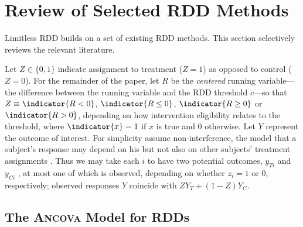 \section{Review of Selected RDD Methods}\label{sec:review}


Limitless RDD builds on a set of existing RDD methods.
This section selectively reviews the relevant literature.

Let $Z \in \{0,1\}$ indicate assignment to treatment ($Z=1$) as opposed to control
($Z=0$).
For the remainder of the paper, let $R$ be the \emph{centered} running
variable---the difference between the running variable and the RDD
threshold $c$---so that $Z \equiv \indicator{R< 0}$,
$\indicator{R \leq 0}$, $\indicator{R\geq 0}$ or $\indicator{R > 0}$,
depending on how intervention eligibility relates to the threshold,
where $\indicator{x}=1$ if $x$ is true and $0$ otherwise.
Let $Y$ represent the outcome of interest.
For simplicity assume non-interference, the model that
a subject's response may depend on his but not also on other subjects'
treatment assignments \citep{cox:1958,rubin:1978}.  Thus we may take each $i$
to have two potential outcomes, $y_{Ti}$ and $y_{Ci}$ , at most one of which is observed, depending on whether $z_i=1$ or $0$, respectively;
 observed
responses $Y$ coincide with $ZY_{T}+(1-Z)Y_{C}$.

\subsection{The \textsc{Ancova} Model for RDDs}\label{sec:robust-analys-covar}

